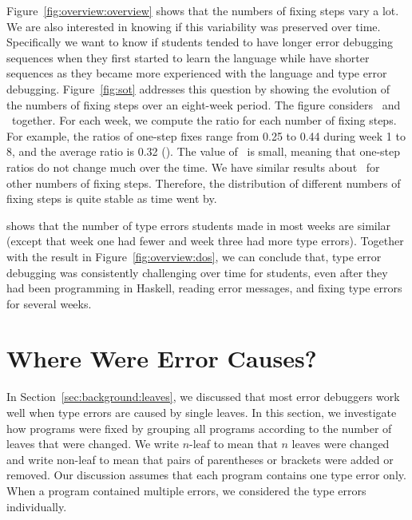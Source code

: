\documentclass[12pt]{report}	%
\begin{document}
Figure~\ref{fig:overview:overview} shows that the numbers
of fixing steps vary a lot. We are also interested in knowing
if this variability was preserved over time.
Specifically we want to know 
if students tended to have longer error
debugging sequences when they first started to learn the language
while have shorter 
sequences as they became more experienced 
with the language
and type error debugging.
%
%
Figure~\ref{fig:sot} 
addresses this question
by showing 
the evolution of the numbers of fixing steps
over an eight-week period.
The figure considers \benchf\ and \benchs\ together.
For each week, we compute the ratio for each number
of fixing steps. 
For example, the ratios of one-step fixes
range from 0.25 to 0.44 during week 1 to 8,
and the average ratio is 0.32 (). 
The value of \std\ is small, meaning that
one-step ratios do not change much over the time.
We have similar results about \std\ for other numbers of 
fixing steps. 
%
Therefore, the distribution of
different numbers of fixing steps is quite stable as time went by.


\cite{hage2006mining} shows
that the number of type errors students made in most
weeks are similar (except that
week one had fewer and week three had more
type errors). Together with the result in
Figure~\ref{fig:overview:dos}, we can conclude
that, type error debugging was consistently 
challenging over time for students, even after they
had been programming in Haskell, reading error messages,
and fixing type errors for several weeks. 

\section{Where Were Error Causes?}
\label{sec:causes}

In Section~\ref{sec:background:leaves}, we discussed that most error debuggers work well
when type errors are caused by single leaves.
In this section, we investigate how programs were fixed
by grouping all programs according to the number of leaves that
were changed. We write $n$-leaf to mean that $n$ leaves
were changed and write non-leaf to mean that
pairs of parentheses or brackets were added or removed. Our discussion assumes
that each program contains one type error only.
When a program contained multiple errors, we considered the type errors
individually.
\end{document}
